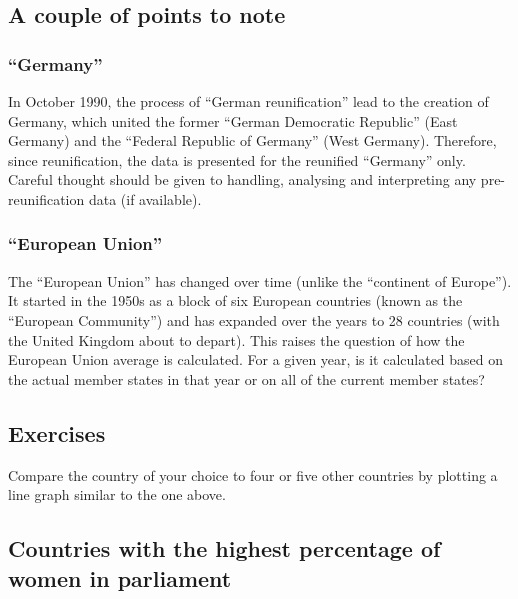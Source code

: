 \documentclass[a4paper,9pt,twocolumn,twoside,printwatermark=false]{pinp}
\begin{document}
\hypertarget{a-couple-of-points-to-note}{%
\subsection{A couple of points to
note}\label{a-couple-of-points-to-note}}

\hypertarget{germany}{%
\subsubsection{``Germany''}\label{germany}}

In October 1990, the process of ``German reunification'' lead to the
creation of Germany, which united the former ``German Democratic
Republic'' (East Germany) and the ``Federal Republic of Germany'' (West
Germany). Therefore, since reunification, the data is presented for the
reunified ``Germany'' only. Careful thought should be given to handling,
analysing and interpreting any pre-reunification data (if available).

\hypertarget{european-union}{%
\subsubsection{``European Union''}\label{european-union}}

The ``European Union'' has changed over time (unlike the ``continent of
Europe''). It started in the 1950s as a block of six European countries
(known as the ``European Community'') and has expanded over the years to
28 countries (with the United Kingdom about to depart). This raises the
question of how the European Union average is calculated. For a given
year, is it calculated based on the actual member states in that year or
on all of the current member states?

\hypertarget{exercises}{%
\subsection{Exercises}\label{exercises}}

Compare the country of your choice to four or five other countries by
plotting a line graph similar to the one above.

\hypertarget{countries-with-the-highest-percentage-of-women-in-parliament}{%
\subsection{Countries with the highest percentage of women in
parliament}\label{countries-with-the-highest-percentage-of-women-in-parliament}}
\end{document}

